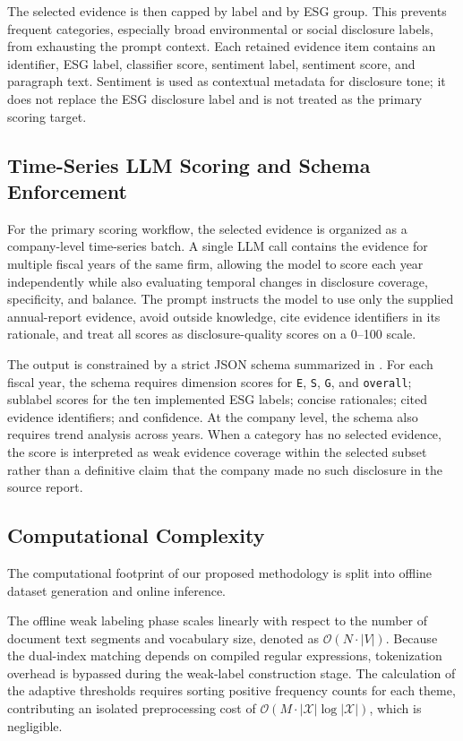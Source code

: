 \documentclass{article}
\theoremstyle{plain}
\theoremstyle{definition}
\theoremstyle{remark}
\begin{document}
The selected evidence is then capped by label and by ESG group. This prevents frequent categories, especially broad environmental or social disclosure labels, from exhausting the prompt context. Each retained evidence item contains an identifier, ESG label, classifier score, sentiment label, sentiment score, and paragraph text. Sentiment is used as contextual metadata for disclosure tone; it does not replace the ESG disclosure label and is not treated as the primary scoring target.

\subsection{Time-Series LLM Scoring and Schema Enforcement}
For the primary scoring workflow, the selected evidence is organized as a company-level time-series batch. A single LLM call contains the evidence for multiple fiscal years of the same firm, allowing the model to score each year independently while also evaluating temporal changes in disclosure coverage, specificity, and balance. The prompt instructs the model to use only the supplied annual-report evidence, avoid outside knowledge, cite evidence identifiers in its rationale, and treat all scores as disclosure-quality scores on a 0--100 scale.

The output is constrained by a strict JSON schema summarized in . For each fiscal year, the schema requires dimension scores for \texttt{E}, \texttt{S}, \texttt{G}, and \texttt{overall}; sublabel scores for the ten implemented ESG labels; concise rationales; cited evidence identifiers; and confidence. At the company level, the schema also requires trend analysis across years. When a category has no selected evidence, the score is interpreted as weak evidence coverage within the selected subset rather than a definitive claim that the company made no such disclosure in the source report.



\subsection{Computational Complexity}
The computational footprint of our proposed methodology is split into offline dataset generation and online inference. 

The offline weak labeling phase scales linearly with respect to the number of document text segments and vocabulary size, denoted as $\mathcal{O}(N \cdot |V|)$. Because the dual-index matching depends on compiled regular expressions, tokenization overhead is bypassed during the weak-label construction stage. The calculation of the adaptive thresholds requires sorting positive frequency counts for each theme, contributing an isolated preprocessing cost of $\mathcal{O}(M \cdot |\mathcal{X}| \log |\mathcal{X}|)$, which is negligible.
\end{document}
